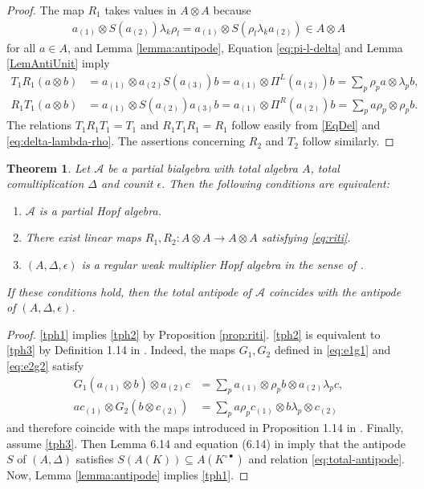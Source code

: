 \documentclass[11pt]{article}
\newtheorem{Theorem}{Theorem}[section]
\theoremstyle{definition}
\numberwithin{equation}{section}
\begin{document}
\begin{proof}
  The map $R_{1}$ takes values in $A\otimes A$ because
  \begin{align*}
  a_{(1)} \otimes
  S(a_{(2)})\lambda_{k}\rho_{l} =  a_{(1)} \otimes S(\rho_{l}\lambda_{k}a_{(2)}) \in A
  \otimes A
  \end{align*}
  for all $a\in A$, and Lemma
  \ref{lemma:antipode},  Equation \eqref{eq:pi-l-delta} and Lemma \ref{LemAntiUnit} imply
  \begin{align*}
    T_{1}R_{1}(a \otimes b)&= a_{(1)} \otimes a_{(2)}S(a_{(3)})b =
    a_{(1)} \otimes \Pi^{L}(a_{(2)})b =
    \sum_{p} \rho_{p}a \otimes \lambda_{p}b, \\
    R_{1}T_{1}(a \otimes b) &= a_{(1)} \otimes S(a_{(2)})a_{(3)}b =
    a_{(1)} \otimes \Pi^{R}(a_{(2)})b = \sum_{p} a\rho_{p}\otimes
    \rho_{p}b.
  \end{align*}
 The relations $T_{1}R_{1}T_{1}=T_{1}$ and
$R_{1}T_{1}R_{1}=R_{1}$ follow easily from  \eqref{EqDel} and
\eqref{eq:delta-lambda-rho}. The assertions concerning $R_{2}$ and
$T_{2}$ follow similarly.
\end{proof}
\begin{Theorem}  \label{theorem:partial-hopf-algebra}
  Let $\mathscr{A}$ be a partial bialgebra with total algebra $A$,
  total comultiplication $\Delta$ and counit $\epsilon$. Then the
  following conditions are equivalent:
  \begin{enumerate}[label={(\arabic*)}]
  \item\label{tph1} $\mathscr{A}$ is a partial Hopf algebra.
  \item\label{tph2} There exist linear maps $R_{1},R_{2} \colon A\otimes A\to
    A\otimes A$ satisfying  \eqref{eq:riti}.
  \item\label{tph3} $(A,\Delta,\epsilon)$  is a regular weak multiplier Hopf algebra in the sense of \cite{VDW1}.
  \end{enumerate}
  If these conditions hold, then the total  antipode of $\mathscr{A}$ coincides with the antipode of $(A,\Delta,\epsilon)$.
\end{Theorem}
\begin{proof}
\ref{tph1} implies \ref{tph2} by Proposition \ref{prop:riti}. \ref{tph2} is equivalent to \ref{tph3} by Definition
1.14 in \cite{VDW1}. Indeed, the maps $G_{1},G_{2}$ defined in \eqref{eq:e1g1} and \eqref{eq:e2g2} satisfy
\begin{align*}
  G_{1}(a_{(1)} \otimes b) \otimes a_{(2)}c &= \sum_{p} a_{(1)} \otimes \rho_{p}b
  \otimes a_{(2)}\lambda_{p}c, \\
  ac_{(1)} \otimes G_{2}(b\otimes c_{(2)}) &=\sum_{p} a\rho_{p}c_{(1)} \otimes b\lambda_{p} \otimes c_{(2)}
\end{align*}
and therefore coincide with the maps introduced in Proposition 1.14 in
\cite{VDW1}.  Finally, assume \ref{tph3}. Then
 Lemma 6.14 and equation (6.14) in \cite{Boh1} imply that the antipode
$S$ of $(A,\Delta)$ satisfies $S(A(K))\subseteq A(K^{\circ\bullet})$ and relation \eqref{eq:total-antipode}.  Now, Lemma \ref{lemma:antipode} implies \ref{tph1}.
\end{proof}
\end{document}
